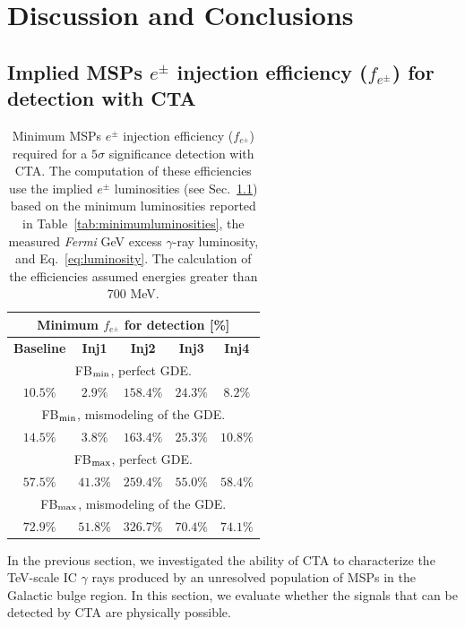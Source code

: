 \documentclass[doublespace,draft,nopageskip]{VTthesis} %
\begin{document}
\section{Discussion and Conclusions}
\label{sec:discussions}

\subsection{Implied MSPs $e^\pm$ injection efficiency ($f_{e^\pm}$) for detection with CTA}
\label{sec:efficiency}
\begin{table}
  \begin{center}
    \begin{tabular}{c|c|c|c|c}
    \hline\hline  
     \multicolumn{5}{c}{ Minimum $f_{e^\pm}$ for detection [\%]}   \tabularnewline \hline
     \textbf{Baseline} & \textbf{Inj1} & \textbf{Inj2} & \textbf{Inj3} & \textbf{Inj4}\tabularnewline \hline
     \multicolumn{5}{c}{ 
     FB$_{\rm min}$, perfect GDE.}   \tabularnewline \hline
     $10.5\%$ & $2.9\%$ & $158.4\%$ & $24.3\%$ & $8.2\%$\tabularnewline \hline
     \multicolumn{5}{c}{ 
     FB$_{\rm min}$, mismodeling of the GDE.}\tabularnewline \hline
     $14.5\%$ & $3.8\%$ & $163.4\%$ & $25.3\%$ & $10.8\%$\tabularnewline \hline
     \multicolumn{5}{c}{ FB$_{\rm max}$, perfect GDE.}\tabularnewline \hline
     $57.5\%$ & $41.3\%$ & $259.4\%$ & $55.0\%$ & $58.4\%$\tabularnewline \hline
     \multicolumn{5}{c}{FB$_{\rm max}$, mismodeling of the GDE.}\tabularnewline \hline
     $72.9\%$ & $51.8\%$ & $326.7\%$ & $70.4\%$ & $74.1\%$\tabularnewline 
     \hline\hline
    \end{tabular}
\caption{Minimum MSPs $e^{\pm}$ injection efficiency ($f_{e^\pm}$) required for a $5\sigma$ significance detection with CTA. The computation of these efficiencies use the implied $e^\pm$ luminosities (see Sec.~\ref{sec:efficiency}) based on the minimum luminosities reported in Table~\ref{tab:minimumluminosities}, the measured \textit{Fermi} GeV excess $\gamma$-ray luminosity, and Eq.~\ref{eq:luminosity}. The calculation of the efficiencies assumed energies greater than 700 MeV.}\label{tab:minimumfe}
  \end{center}
\end{table}


In the previous section, we  investigated the ability of CTA to characterize the TeV-scale IC $\gamma$ rays produced by an unresolved population of MSPs in the Galactic bulge region. In this section, we evaluate whether the signals that can be detected by CTA are physically possible.
\end{document}
